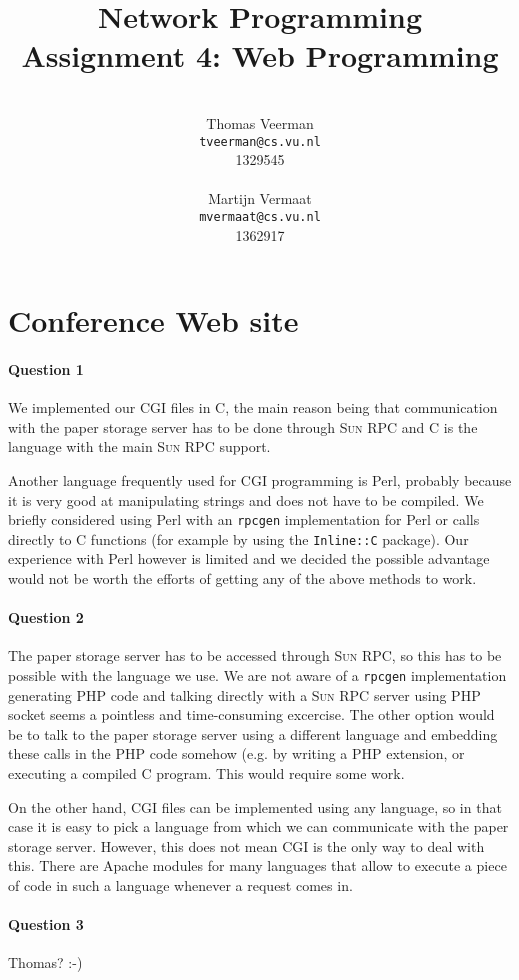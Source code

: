 \documentclass[a4paper,10pt]{article}
\title{Network Programming\\
\small{Assignment 4: Web Programming}}
\author{%
        \mbox{}\\
        Thomas Veerman\\
        \texttt{tveerman@cs.vu.nl}\\
        1329545\\
        \mbox{}\\
        Martijn Vermaat\\
        \texttt{mvermaat@cs.vu.nl}\\
        1362917
}
\begin{document}
\maketitle

\section{Conference Web site}
\paragraph{Question 1}
We implemented our \textsc{CGI} files in C, the main reason being that
communication with the paper storage server has to be done through \textsc{Sun RPC}
and C is the language with the main \textsc{Sun RPC} support.

Another language frequently used for \textsc{CGI} programming is Perl,
probably because it is very good at manipulating strings and does not have to
be compiled. We briefly considered using Perl with an \texttt{rpcgen}
implementation for Perl or calls directly to C functions (for
example by using the \texttt{Inline::C} package). Our experience with Perl
however is limited and we decided the possible advantage would not be worth the
efforts of getting any of the above methods to work.

\paragraph{Question 2}
The paper storage server has to be accessed through \textsc{Sun RPC}, so this has
to be possible with the language we use. We are not aware of a \texttt{rpcgen}
implementation generating PHP code and talking directly with a \textsc{Sun RPC}
server using PHP socket seems a pointless and time-consuming excercise. The
other option would be to talk to the paper storage server using a different language
and embedding these calls in the PHP code somehow (e.g. by writing a PHP
extension, or executing a compiled C program. This would require some work.

On the other hand, \textsc{CGI} files can be implemented using any language, so in
that case it is easy to pick a language from which we can communicate with the
paper storage server. However, this does not mean \textsc{CGI} is the only way to
deal with this. There are Apache modules for many languages that allow to
execute a piece of code in such a language whenever a request comes in.

\paragraph{Question 3}
Thomas? :-)
\end{document}
